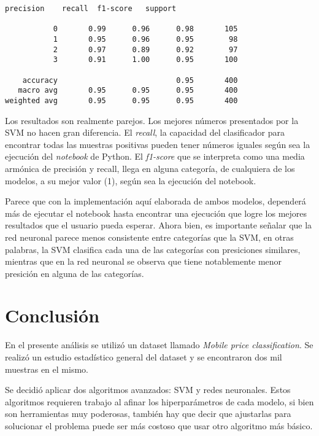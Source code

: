 \documentclass[12pt,a4paper,table]{article}
\begin{document}
    \begin{Verbatim}[commandchars=\\\{\}]
              precision    recall  f1-score   support

           0       0.99      0.96      0.98       105
           1       0.95      0.96      0.95        98
           2       0.97      0.89      0.92        97
           3       0.91      1.00      0.95       100

    accuracy                           0.95       400
   macro avg       0.95      0.95      0.95       400
weighted avg       0.95      0.95      0.95       400

    \end{Verbatim}

    Los resultados son realmente parejos. Los mejores números presentados
por la SVM no hacen gran diferencia. El \emph{recall}, la capacidad del
clasificador para encontrar todas las muestras positivas pueden tener
números iguales según sea la ejecución del \emph{notebook} de Python. El
\emph{f1-score} que se interpreta como una media armónica de precisión y
recall, llega en alguna categoría, de cualquiera de los modelos, a su
mejor valor (1), según sea la ejecución del notebook.

Parece que con la implementación aquí elaborada de ambos modelos,
dependerá más de ejecutar el notebook hasta encontrar una ejecución que
logre los mejores resultados que el usuario pueda esperar. Ahora bien,
es importante señalar que la red neuronal parece menos consistente entre
categorías que la SVM, en otras palabras, la SVM clasifica cada una de
las categorías con presiciones similares, mientras que en la red
neuronal se observa que tiene notablemente menor presición en alguna de
las categorías.

    \hypertarget{conclusiuxf3n}{%
\section{Conclusión}\label{conclusiuxf3n}}

En el presente análisis se utilizó un dataset llamado \emph{Mobile price
classification}. Se realizó un estudio estadístico general del dataset y
se encontraron dos mil muestras en el mismo.

Se decidió aplicar dos algoritmos avanzados: SVM y redes neuronales.
Estos algoritmos requieren trabajo al afinar los hiperparámetros de cada
modelo, si bien son herramientas muy poderosas, también hay que decir
que ajustarlas para solucionar el problema puede ser más costoso que
usar otro algoritmo más básico.
\end{document}
